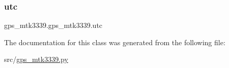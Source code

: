 \mbox{\label{classgps__mtk3339_1_1gps__mtk3339_aa7849c72105267400545a92f8bebc5a4}} 
\subsubsection{\texorpdfstring{utc}{utc}}
{\footnotesize\ttfamily gps\+\_\+mtk3339.\+gps\+\_\+mtk3339.\+utc}



The documentation for this class was generated from the following file\+:\begin{DoxyCompactItemize}
\item 
src/\hyperlink{gps__mtk3339_8py}{gps\+\_\+mtk3339.\+py}\end{DoxyCompactItemize}
